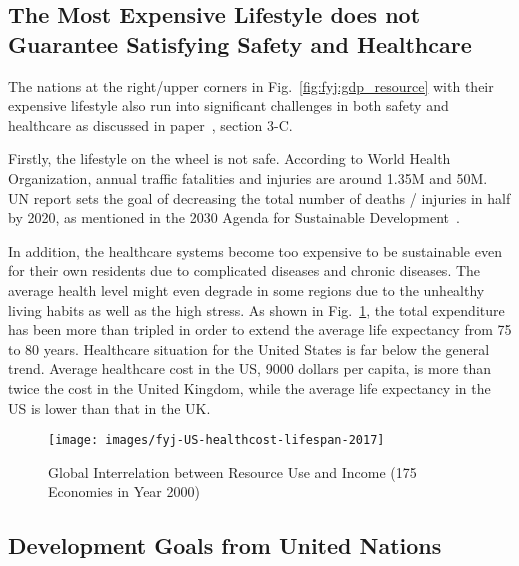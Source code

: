 \documentclass[letterpaper, twocolumn, 10pt, conference]{IEEEtran}
\begin{document}
\subsection{The Most Expensive Lifestyle does not Guarantee Satisfying Safety and Healthcare}
\label{ssec:expensive_lifestyle}

The nations at the right/upper corners in Fig.~\ref{fig:fyj:gdp_resource} with their expensive lifestyle also run into significant challenges in both safety and healthcare as discussed in paper~\cite{mit-uv2014}, section 3-C. 

Firstly, the lifestyle on the wheel is not safe. 
According to World Health Organization, annual traffic fatalities and injuries are around 1.35M and 50M. UN report sets the goal of decreasing the total number of deaths / injuries in half by 2020, as mentioned in the 2030 Agenda for Sustainable Development~\cite{fatal-accident}.

In addition, the healthcare systems become too expensive to be sustainable even for their own residents due to complicated diseases and chronic diseases. The average health level might even degrade in some regions due to the unhealthy living habits as well as the high stress. As shown in Fig.~\ref{fig:fyj:US-healthcost-lifespan-2017}, the total expenditure has been more than tripled in order to extend the average life expectancy from 75 to 80 years. Healthcare situation for the United States is far below the general trend. Average healthcare cost in the US, 9000 dollars per capita, is more than twice the cost in the United Kingdom, while the average life expectancy in the US is lower than that in the UK. 

\begin{figure}[h!]
        \centering
        \texttt{[image: images/fyj-US-healthcost-lifespan-2017]}
        \caption{Global Interrelation between Resource Use and Income (175 Economies in Year 2000)}
        \label{fig:fyj:US-healthcost-lifespan-2017}
\end{figure}

\subsection{Development Goals from United Nations}
\label{ssec:UN-development-goals}
\end{document}
